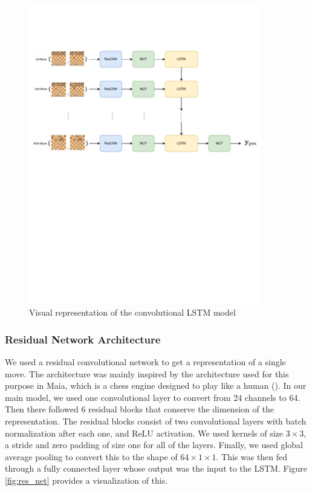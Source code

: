 \begin{figure}[ht!]
    \centering
    \includegraphics[width=0.9\textwidth]{figures/convLSTM.pdf}
    \caption{Visual representation of the convolutional LSTM model}
    \label{fig:convLSTM}
\end{figure}

\subsubsection{Residual Network Architecture}
We used a residual convolutional network to get a representation of a single move. The architecture was mainly inspired by the architecture used for this purpose in Maia, which is a chess engine designed to play like a human (\citealp{maia}). In our main model, we used one convolutional layer to convert from 24 channels to 64. Then there followed 6 residual blocks that conserve the dimension of the representation. 
The residual blocks consist of two convolutional layers with batch normalization after each one, and ReLU activation.
We used kernels of size $3\times 3$, a stride and zero padding of size one for all of the layers.
Finally, we used global average pooling to convert this to the shape of $64\times1\times1$. This was then fed through a fully connected layer whose output was the input to the LSTM. Figure \ref{fig:res_net} provides a visualization of this.


